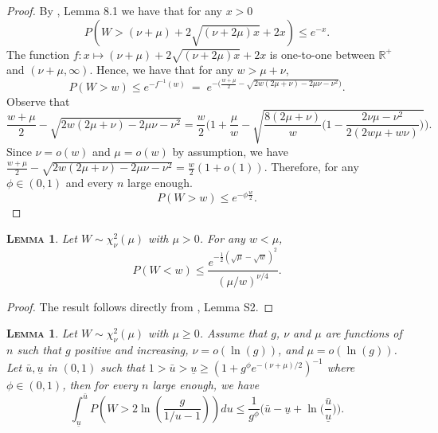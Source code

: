 \documentclass[bj,authoryear]{imsart}
\theoremstyle{plain}
\newtheorem{lem}[thm]{\textsc{Lemma}}
\newcommand{\R}{\mathbb{R}}
\begin{document}
\begin{proof}
By \cite{birge}, Lemma 8.1 we have that for any $x>0$
$$P(W> (\nu+\mu)+2 \sqrt{(\nu+2 \mu) x}+2 x) \leq e^{-x}.$$
The function $f:x\mapsto (\nu+\mu)+2 \sqrt{(\nu+2 \mu) x}+2 x$ is  one-to-one between $\R^+$ and $( \nu+
\mu,\infty)$. 
Hence, we have that for any $w>\mu+\nu$,
$$P(W > w) \leq e^{-f^{-1}(w)} \:=\; e^{-\big(\frac{w+\mu}{2}  - \sqrt{2w(2 \mu+\nu)-2 \mu \nu - \nu^2 }\big) } .$$
Observe that
$$\frac{w+\mu}{2}  - \sqrt{2w( 2 \mu+ \nu)-2 \mu \nu - \nu^2 }= \frac{w}{2}\bigg(1+\frac{\mu}{w} -\sqrt{\frac{8(2 \mu+\nu)}{w}\bigg(1-\frac{2\nu\mu-\nu^2}{2(2w\mu+w\nu)} \bigg)}\bigg).$$
 Since $\nu=o(w)$ and $\mu=o(w)$ by assumption, we have $\frac{w+\mu}{2}  - \sqrt{2w( 2 \mu+ \nu)-2 \mu \nu - \nu^2 }= \frac{w}{2}(1+o(1))$. Therefore, for any $\phi\in(0,1)$ and every $n$ large enough.
$$P(W > w) \leq  e^{-\phi\frac{w}{2}}.$$
\end{proof}


\begin{lem}\label{lemma:s2} Let $W \sim \chi_\nu^2(\mu)$ with $\mu>0$. For any $w<\mu$, 
$$
P(W<w) \leq \frac{e^{-\frac{1}{2}(\sqrt{\mu}-\sqrt{w})^2}}{(\mu / w)^{\nu / 4}}.$$
\end{lem}

\begin{proof}
The result follows directly from \cite{rossell2022concentration}, Lemma S2.
\end{proof}

\begin{lem}\label{lemma:s18} 
    Let $W\sim \chi_\nu^2(\mu)$ with $\mu \geq 0$. Assume that $g$, $\nu$ and $\mu$ are functions of $n$ such that $g$ positive and increasing,  $\nu=o(\ln(g))$, and $\mu=o(\ln(g))$. Let $\bar{u},\underline{u}$ in $(0,1)$ such that $1>\bar{u}>\underline{u}\geq\left(1+g^{\phi}e^{-(\nu+\mu)/2}\right)^{-1}$ where $\phi\in(0,1)$, then for every $n$ large enough, we have 
$$
\int_{\underline{u}}^{\bar{u}} P\left(W>2\ln \left(\frac{g}{1 / u-1}\right)\right) d u \leq  \frac{1}{g^{\phi}}\Big(\bar{u}-\underline{u}+\ln\Big(\frac{\bar{u}}{\underline{u}}\Big)\Big).
$$
\end{lem}
\end{document}
